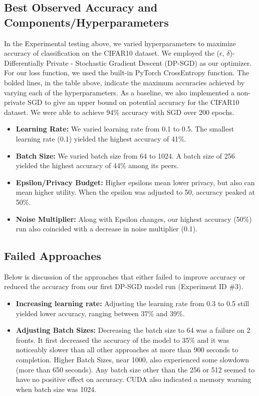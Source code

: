 \subsection{Best Observed Accuracy and Components/Hyperparameters}\label{subsec:best-accuracy}
In the Experimental testing above, we varied hyperparameters to maximize accuracy of classification on the CIFAR10 dataset. We employed the
($\epsilon$, $\delta$)-Differentially Private - Stochastic Gradient Descent (DP-SGD) as our optimizer. For our loss function, we used the built-in PyTorch CrossEntropy function.
The bolded lines, in the table above, indicate the maximum accuracies achieved by varying each of the hyperparameters. As a baseline, we also implemented
a non-private SGD to give an upper bound on potential accuracy for the CIFAR10 dataset. We were able to achieve 94\% accuracy with SGD over 200 epochs.
\begin{itemize}
    \item \textbf{Learning Rate:} We varied learning rate from 0.1 to 0.5. The smallest learning rate (0.1) yielded the highest accuracy of 41\%.
    \item \textbf{Batch Size:} We varied batch size from 64 to 1024. A batch size of 256 yielded the highest accuracy of 44\% among its peers.
    \item \textbf{Epsilon/Privacy Budget:} Higher epsilons mean lower privacy, but also can mean higher utility. When the epsilon was adjusted to 50, accuracy peaked at 50\%.
    \item \textbf{Noise Multiplier:} Along with Epsilon changes, our highest accuracy (50\%) run also coincided with a decrease in noise multiplier (0.1).
\end{itemize}

\subsection{Failed Approaches}\label{subsec:failed-approaches}
Below is discussion of the approaches that either failed to improve accuracy or reduced the accuracy from our first DP-SGD model run (Experiment ID \#3).

\begin{itemize}
    \item \textbf{Increasing learning rate:} Adjusting the learning rate from 0.3 to 0.5 still yielded lower accuracy, ranging between 37\% and 39\%.
    \item \textbf{Adjusting Batch Sizes:} Decreasing the batch size to 64 was a failure on 2 fronts. It first decreased the accuracy of the model to 35\% and it was noticeably slower than all other approaches at more than 900 seconds to completion. Higher Batch Sizes, near 1000, also experienced some slowdown (more than 650 seconds). Any batch size other than the 256 or 512 seemed to have no positive effect on accuracy. CUDA also indicated a memory warning when batch size was 1024.
\end{itemize}

